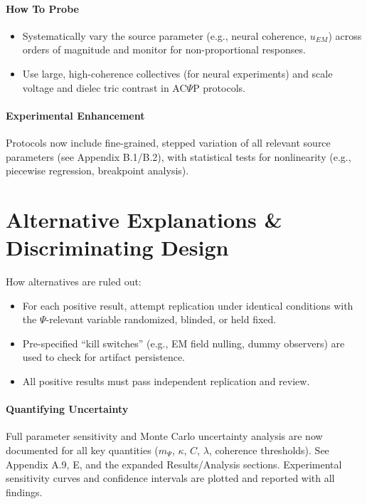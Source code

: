 \documentclass{report}
\begin{document}
\paragraph{How To Probe}
\begin{itemize}
    \item Systematically vary the source parameter (e.g., neural coherence, $u_{EM}$) across orders of
    magnitude and monitor for non-proportional responses.
    \item Use large, high-coherence collectives (for neural experiments) and scale voltage and dielec tric contrast in AC$\Psi$P protocols.
\end{itemize}

\paragraph{Experimental Enhancement}
Protocols now include fine-grained, stepped variation of all
relevant source parameters (see Appendix B.1/B.2), with statistical tests for nonlinearity (e.g.,
piecewise regression, breakpoint analysis). %

\section{Alternative Explanations \& Discriminating Design}
\label{sec:alternative_explanations_cfh_main}

How alternatives are ruled out:
\begin{itemize}
    \item For each positive result, attempt replication under identical conditions with the $\Psi$-relevant
    variable randomized, blinded, or held fixed.
    \item Pre-specified “kill switches” (e.g., EM field nulling, dummy observers) are used to check
    for artifact persistence.
    \item All positive results must pass independent replication and review.
\end{itemize}

\paragraph{Quantifying Uncertainty}
Full parameter sensitivity and Monte Carlo uncertainty analysis
are now documented for all key quantities ($m_\Psi$, $\kappa$, $C$, $\lambda$, coherence thresholds). See Appendix
A.9, E, and the expanded Results/Analysis sections. %
Experimental sensitivity curves and confidence intervals are plotted and reported with all findings.
\end{document}
